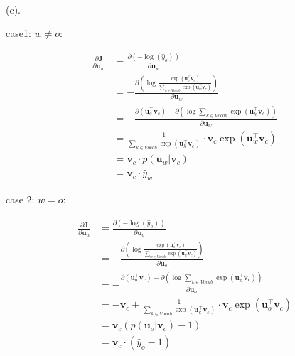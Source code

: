 \documentclass{article}
\begin{document}
~\\

(c). 

case1: $w \neq o$: 

\begin{equation*}
  \begin{aligned}
    \frac{\partial \boldsymbol{J}}{\partial \boldsymbol{u}_w} &= \frac{\partial (- \log (\hat{y}_o))}{\partial \boldsymbol{u}_w} \\ 
    & = - \frac{\partial (\log \frac{\exp (\boldsymbol{u}_{o}^{\intercal} \boldsymbol{v}_{c})}{\sum_{w \in Vocab} \exp (\boldsymbol{u}_{w}^{\intercal}\boldsymbol{v}_{c})})}{\partial \boldsymbol{u}_w} \\ 
    & = - \frac{\partial (\boldsymbol{u}_{o}^{\intercal} \boldsymbol{v}_{c}) - \partial (\log \sum_{k \in Vocab} \exp (\boldsymbol{u}_{k}^{\intercal}\boldsymbol{v}_{c}) )}{\partial \boldsymbol{u}_w} \\ 
    & = \frac{1}{\sum_{k \in Vocab} \exp (\boldsymbol{u}_{k}^{\intercal}\boldsymbol{v}_{c})} \cdot \boldsymbol{v}_c \exp (\boldsymbol{u}_{w}^{\intercal}\boldsymbol{v}_{c}) \\
    & = \boldsymbol{v}_c \cdot p(\boldsymbol{u}_{w} | \boldsymbol{v}_c) \\ 
    & = \boldsymbol{v}_c \cdot \hat{y}_w
  \end{aligned}
\end{equation*}

case 2: $w = o$: 

\begin{equation*}
  \begin{aligned}
    \frac{\partial \boldsymbol{J}}{\partial \boldsymbol{u}_w} &= \frac{\partial (- \log (\hat{y}_o))}{\partial \boldsymbol{u}_o} \\ 
    & = - \frac{\partial (\log \frac{\exp (\boldsymbol{u}_{o}^{\intercal} \boldsymbol{v}_{c})}{\sum_{w \in Vocab} \exp (\boldsymbol{u}_{w}^{\intercal}\boldsymbol{v}_{c})})}{\partial \boldsymbol{u}_o} \\ 
    & = - \frac{\partial (\boldsymbol{u}_{o}^{\intercal} \boldsymbol{v}_{c}) - \partial (\log \sum_{k \in Vocab} \exp (\boldsymbol{u}_{k}^{\intercal}\boldsymbol{v}_{c}) )}{\partial \boldsymbol{u}_o} \\ 
    & = - \boldsymbol{v}_c + \frac{1}{\sum_{k \in Vocab} \exp (\boldsymbol{u}_{k}^{\intercal}\boldsymbol{v}_{c})} \cdot \boldsymbol{v}_c \exp (\boldsymbol{u}_{o}^{\intercal}\boldsymbol{v}_{c}) \\ 
    & = \boldsymbol{v}_c \left( p(\boldsymbol{u}_o | \boldsymbol{v}_c) -1 \right) \\
    & = \boldsymbol{v}_c \cdot (\hat{y}_o - 1)
  \end{aligned}
\end{equation*}
\end{document}
